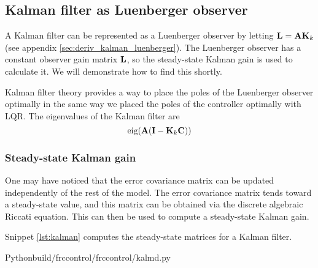 \subsection{Kalman filter as Luenberger observer}

A Kalman filter can be represented as a Luenberger \gls{observer} by letting
$\mathbf{L} = \mathbf{A} \mathbf{K}_k$ (see appendix \ref{sec:deriv_kalman_luenberger}).
The Luenberger observer has a constant observer gain matrix $\mathbf{L}$, so the
steady-state Kalman gain is used to calculate it. We will demonstrate how to
find this shortly.

Kalman filter theory provides a way to place the poles of the Luenberger
observer optimally in the same way we placed the poles of the controller
optimally with LQR. The eigenvalues of the Kalman filter are
\begin{equation}
  \operatorname{eig}(\mathbf{A}(\mathbf{I} - \mathbf{K}_k\mathbf{C}))
\end{equation}

\subsubsection{Steady-state Kalman gain}

One may have noticed that the error covariance matrix can be updated
independently of the rest of the \gls{model}. The error covariance matrix tends
toward a steady-state value, and this matrix can be obtained via the discrete
algebraic Riccati equation. This can then be used to compute a steady-state
Kalman gain.

Snippet \ref{lst:kalman} computes the steady-state matrices for a Kalman
filter.
\begin{code}{Python}{build/frccontrol/frccontrol/kalmd.py}
  \caption{Steady-state Kalman gain and error covariance matrices calculation in
    Python}
  \label{lst:kalman}
\end{code}
